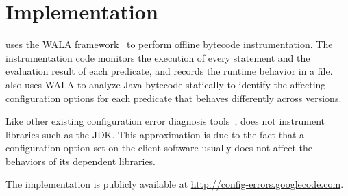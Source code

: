 \section{Implementation}
\label{sec:implementation}

\ourtool uses the WALA framework~\cite{wala} to perform offline
bytecode instrumentation. The instrumentation code
monitors the execution of every statement and the evaluation
result of each predicate, and records the runtime behavior
in a file. \ourtool also uses WALA
to analyze Java bytecode statically to
identify the affecting configuration options
for each predicate that behaves differently across versions.

Like other existing configuration error
diagnosis tools~\cite{Rabkin:2011:PPC, Zhang:2013:ADS}, \ourtool
does not instrument libraries such as the JDK.
This approximation is due to the fact that a configuration
option set on the client software usually
does not affect the behaviors of its dependent libraries.

The \ourtool implementation is publicly available at
\url{http://config-errors.googlecode.com}.
